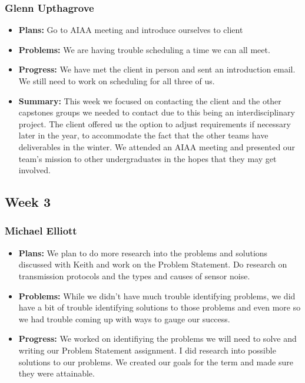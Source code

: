 \documentclass[onecolumn, draftclsnofoot,10pt, compsoc]{IEEEtran}
\begin{document}
\subsubsection{Glenn Upthagrove}
\begin {itemize}
 \item \textbf{Plans: }Go to AIAA meeting and introduce ourselves to client
 \item \textbf{Problems: }We are having trouble scheduling a time we can all meet.
 \item \textbf{Progress: }We have met the client in person and sent an introduction email. We still need to work on scheduling for all three of us. 
 \item \textbf{Summary: }This week we focused on contacting the client and the other capstones groups we needed to contact due to this being an interdisciplinary project. The client offered us the option to adjust requirements if necessary later in the year, to accommodate the fact that the other teams have deliverables in the winter. We attended an AIAA meeting and presented our team's mission to other undergraduates in the hopes that they may get involved. 
\end {itemize}
\subsection {Week 3}
\subsubsection{Michael Elliott}
\begin {itemize}
\item \textbf{Plans: }
  We plan to do more research into the problems and solutions discussed with Keith and work on the Problem Statement. Do research on transmission protocols and the types and causes of sensor noise.
\item \textbf{Problems: }
  While we didn't have much trouble identifying problems, we did have a bit of trouble identifying solutions to those problems and even more so we had trouble coming up with ways to gauge our success.
\item \textbf{Progress: }
  We worked on identifiying the problems we will need to solve and writing our Problem Statement assignment. I did research into possible solutions to our problems. We created our goals for the term and made sure they were attainable.
\end {itemize}
\end{document}
